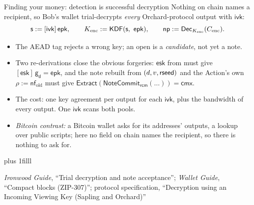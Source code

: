 \documentclass[aspectratio=169,11pt]{beamer}
\newcommand{\nfsym}{\ensuremath{\mathsf{nf}}}
\newcommand{\cmx}{\ensuremath{\mathsf{cmx}}}
\newcommand{\gd}{\ensuremath{\mathsf{g_d}}}
\newcommand{\ivk}{\ensuremath{\mathsf{ivk}}}
\newcommand{\rcm}{\ensuremath{\mathsf{rcm}}}
\newcommand{\esk}{\ensuremath{\mathsf{esk}}}
\newcommand{\epk}{\ensuremath{\mathsf{epk}}}
\newcommand{\Extract}{\ensuremath{\mathsf{Extract}}}
\newcommand{\NoteCommit}{\ensuremath{\mathsf{NoteCommit}}}
\newcommand{\src}[1]{\par\vskip0pt plus 1filll
  {\fontsize{6}{7.2}\selectfont\color{arbdim}\raggedright #1\par}}
\begin{document}
\begin{frame}{Finding your money: detection is successful decryption}
Nothing on chain names a recipient, so Bob's wallet trial-decrypts
\emph{every} Orchard-protocol output with \ivk:
\[
\mathsf{s} := [\ivk]\,\epk, \qquad
\Fkenc := \mathsf{KDF}(\mathsf{s},\ \epk), \qquad
\Fnp := \mathsf{Dec}_{\Fkenc}(\Fenc).
\]
\begin{itemize}
  \item The AEAD tag rejects a wrong key; an open is a \emph{candidate},
    not yet a note.
  \item Two re-derivations close the obvious forgeries: \esk{} from
    \Frseed{} must give $[\esk]\,\gd = \epk$, and the note rebuilt from
    $(d, v, \mathsf{rseed})$ and the Action's own $\rho := \nfsym_{\mathrm{old}}$
    must give $\Extract(\NoteCommit_{\rcm}(\ldots)) = \cmx$.
  \item The cost: one key agreement per output for each \ivk, plus the
    bandwidth of every output. One \ivk{} scans both pools.
  \item \emph{Bitcoin contrast:} a Bitcoin wallet asks for its addresses'
    outputs, a lookup over public scripts; here no field on chain names
    the recipient, so there is nothing to ask for.
\end{itemize}
\src{\emph{Ironwood Guide}, ``Trial decryption and note acceptance'';
  \emph{Wallet Guide}, ``Compact blocks (ZIP-307)''; protocol specification,
  ``Decryption using an Incoming Viewing Key (Sapling and Orchard)''}
\end{frame}
\end{document}
